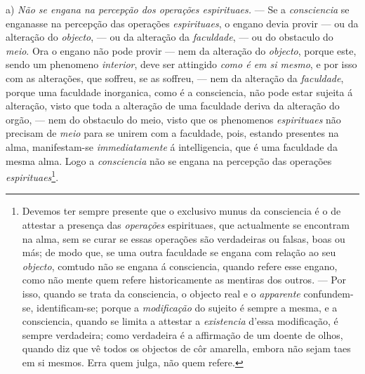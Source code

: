 a) \emph{Não se engana na percepção dos operações espirituaes.} --- Se a \emph{consciencia} se enganasse na percepção das operações \emph{espirituaes}, o engano devia provir --- ou da alteração do \emph{objecto}, --- ou da alteração da \emph{faculdade}, --- ou do obstaculo do \emph{meio}. Ora o engano não pode provir --- nem da alteração do \emph{objecto}, porque este, sendo um phenomeno \emph{interior}, deve ser attingido \emph{como é em si mesmo}, e por isso com as alterações, que soffreu, se as soffreu, --- nem da alteração da \emph{faculdade}, porque uma faculdade  inorganica, como é a consciencia, não pode estar sujeita á alteração, visto que toda a alteração de uma faculdade deriva da alteração do orgão, --- nem do obstaculo do meio, visto que os phenomenos \emph{espirituaes} não precisam de \emph{meio} para se unirem com a faculdade, pois, estando presentes na alma, manifestam-se \emph{immediatamente} á intelligencia, que é uma faculdade da mesma alma. Logo a \emph{consciencia} não se engana na percepção das operações \emph{espirituaes}\footnote{Devemos ter sempre presente que o exclusivo munus da consciencia é o de attestar a presença das \emph{operações} espirituaes, que actualmente se encontram na alma, sem se curar se essas operações são verdadeiras ou falsas, boas ou más; de modo que, se uma outra faculdade se engana com relação ao seu \emph{objecto}, comtudo não se engana á consciencia, quando refere esse engano, como não mente quem refere historicamente as mentiras dos outros. --- Por isso, quando se trata da consciencia, o objecto real e o \emph{apparente} confundem-se, identificam-se; porque a \emph{modificação} do sujeito é sempre a mesma, e a consciencia, quando se limita a attestar a \emph{existencia} d'essa modificação, é sempre verdadeira; como verdadeira é a affirmação de um doente de olhos, quando diz que vê todos os objectos de côr amarella, embora não sejam taes em si mesmos. Erra quem julga, não quem refere.}.

